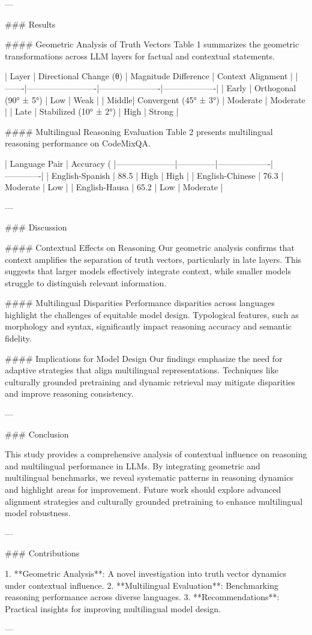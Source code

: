 ---

### Results

#### Geometric Analysis of Truth Vectors
Table 1 summarizes the geometric transformations across LLM layers for factual and contextual statements.

| Layer | Directional Change (θ) | Magnitude Difference | Context Alignment |
|-------|-------------------------|----------------------|-------------------|
| Early | Orthogonal (90° ± 5°)  | Low                 | Weak             |
| Middle| Convergent (45° ± 3°)  | Moderate            | Moderate         |
| Late  | Stabilized (10° ± 2°)  | High                | Strong           |

#### Multilingual Reasoning Evaluation
Table 2 presents multilingual reasoning performance on CodeMixQA.

| Language Pair       | Accuracy (%
|---------------------|--------------|-------------------|-------------|
| English-Spanish     | 88.5         | High              | High        |
| English-Chinese     | 76.3         | Moderate          | Low         |
| English-Hausa       | 65.2         | Low               | Moderate    |

---

### Discussion

#### Contextual Effects on Reasoning
Our geometric analysis confirms that context amplifies the separation of truth vectors, particularly in late layers. This suggests that larger models effectively integrate context, while smaller models struggle to distinguish relevant information.

#### Multilingual Disparities
Performance disparities across languages highlight the challenges of equitable model design. Typological features, such as morphology and syntax, significantly impact reasoning accuracy and semantic fidelity.

#### Implications for Model Design
Our findings emphasize the need for adaptive strategies that align multilingual representations. Techniques like culturally grounded pretraining and dynamic retrieval may mitigate disparities and improve reasoning consistency.

---

### Conclusion

This study provides a comprehensive analysis of contextual influence on reasoning and multilingual performance in LLMs. By integrating geometric and multilingual benchmarks, we reveal systematic patterns in reasoning dynamics and highlight areas for improvement. Future work should explore advanced alignment strategies and culturally grounded pretraining to enhance multilingual model robustness.

---

### Contributions

1. **Geometric Analysis**: A novel investigation into truth vector dynamics under contextual influence.
2. **Multilingual Evaluation**: Benchmarking reasoning performance across diverse languages.
3. **Recommendations**: Practical insights for improving multilingual model design.

---